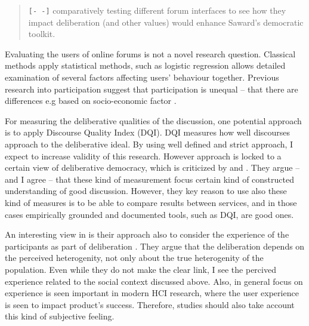 \documentclass[journal,a4paper]{IEEEtran}
\begin{document}
\begin{quote}
\texttt{[- -]} comparatively testing different forum interfaces to see how they impact deliberation (and other values) would 
enhance Saward’s democratic toolkit.
\end{quote}

Evaluating the users of online forums is not a novel research question. Classical methods apply statistical methods, such as logistic regression allows detailed examination of several factors affecting users' behaviour together. Previous research into participation suggest that participation is unequal -- that there are differences e.g  based on socio-economic factor .

For measuring the deliberative qualities of the discussion, one potential approach is to apply  Discourse Quality Index (DQI). DQI measures how well discourses approach to the deliberative ideal. By using well defined and strict approach, I expect to increase validity of this research. However  approach is locked to a certain view of deliberative democracy, which is criticized by  and . They argue -- and I agree -- that these kind of measurement focus certain kind of constructed understanding of good discussion. However, they key reason to use also these kind of measures is to be able to compare results between services, and in those cases empirically grounded and documented tools, such as DQI, are good ones.

An interesting view in  is their approach also to consider the experience of the participants as part of deliberation . They argue that the deliberation depends on the perceived heterogenity, not only about the true heterogenity of the population. Even while they do not make the clear link, I see the percived experience related to the social context discussed above. Also, in general focus on experience is seen important in modern HCI research, where the user experience is seen to impact product's success. Therefore, studies should also take account this kind of subjective feeling.



\end{document}
